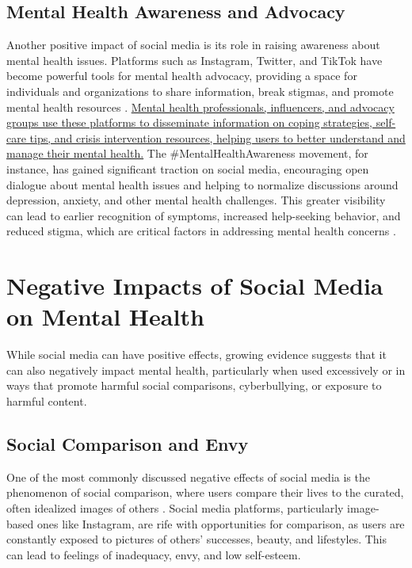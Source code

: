 \documentclass[12pt]{article}
\begin{document}
\subsection{Mental Health Awareness and Advocacy}

Another positive impact of social media is its role in raising awareness about mental health issues. Platforms such as Instagram, Twitter, and TikTok have become powerful tools for mental health advocacy, providing a space for individuals and organizations to share information, break stigmas, and promote mental health resources \cite{smith2018}. \ul{Mental health professionals, influencers, and advocacy groups use these platforms to disseminate information on coping strategies, self-care tips, and crisis intervention resources, helping users to better understand and manage their mental health.}
The \#MentalHealthAwareness movement, for instance, has gained significant traction on social media, encouraging open dialogue about mental health issues and helping to normalize discussions around depression, anxiety, and other mental health challenges. This greater visibility can lead to earlier recognition of symptoms, increased help-seeking behavior, and reduced stigma, which are critical factors in addressing mental health concerns \cite{smith2018}.

\section{Negative Impacts of Social Media on Mental Health}

While social media can have positive effects, growing evidence suggests that it can also negatively impact mental health, particularly when used excessively or in ways that promote harmful social comparisons, cyberbullying, or exposure to harmful content.

\subsection{Social Comparison and Envy}

One of the most commonly discussed negative effects of social media is the phenomenon of social comparison, where users compare their lives to the curated, often idealized images of others \cite{lup2015}. Social media platforms, particularly image-based ones like Instagram, are rife with opportunities for comparison, as users are constantly exposed to pictures of others’ successes, beauty, and lifestyles. This can lead to feelings of inadequacy, envy, and low self-esteem.
\end{document}
